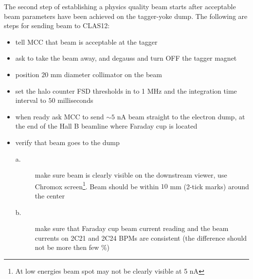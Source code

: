 The second step of establishing a physics quality beam starts after acceptable beam parameters have been achieved on the tagger-yoke dump. The following are steps for sending beam to CLAS12:
\begin{itemize}
\item tell MCC that beam is acceptable at the tagger
\item ask to take the beam away, and degauss and turn OFF the tagger magnet 
\item position $20$ mm diameter collimator on the beam 
\item set the halo counter FSD thresholds in to 1 MHz and the integration time interval to $50$ milliseconds
\item when ready ask MCC to send $\sim 5$ nA beam straight to the electron dump, at the end of the Hall B beamline where Faraday cup is located 
\item verify that beam goes to the dump 
\begin{description}
\item[a.] make sure beam is clearly visible on the downstream viewer, use Chromox screen\footnote{At low energies beam spot may not be clearly visible at 5 nA}. Beam should be within $10$ mm (2-tick marks) around the center 
\item[b.] make sure that Faraday cup beam current reading and the beam currents on 2C21 and 2C24 BPMs are consistent (the difference  should not be more then few \%)
\end{description}
\end{itemize}

